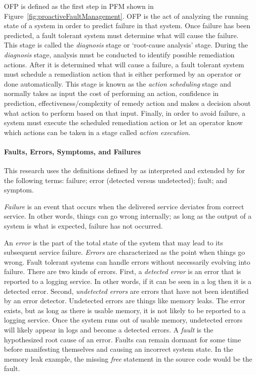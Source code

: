 
\ac{OFP} is defined as the first step in \ac{PFM} shown in
Figure~\ref{fig:proactiveFaultManagement}.  \ac{OFP} is the act of analyzing
the running state of a system in order to predict failure in that system. Once
failure has been predicted, a fault tolerant system must determine what will
cause the failure.  This stage is called the \emph{diagnosis} stage or
`root-cause analysis' stage.  During the \emph{diagnosis} stage, analysis
must be conducted to identify possible remediation actions.  After it is
determined what will cause a failure, a fault tolerant system must schedule a
remediation action that is either performed by an operator or done
automatically.  This stage is known as the \emph{action scheduling} stage and
normally takes as input the cost of performing an action, confidence in
prediction, effectiveness/complexity of remedy action and makes a decision
about what action to perform based on that input.  Finally, in order to avoid
failure, a system must execute the scheduled remediation action or let an
operator know which actions can be taken in a stage called \emph{action
execution}.

\paragraph{Faults, Errors, Symptoms, and Failures}
This research uses the definitions defined by \citet{avivzienis2004basic} as
interpreted and extended by \citet{salfnerSurvey} for the following terms:
failure; error (detected versus undetected); fault; and symptom.

\emph{Failure} is an event that occurs when the delivered service deviates from
correct service.  In other words, things can go wrong internally; as long as
the output of a system is what is expected, failure has not occurred.  

An \emph{error} is the part of the total state of the system that may lead to
its subsequent service failure.  \emph{Errors} are characterized as the point
when things go wrong.  Fault tolerant systems can handle errors without
necessarily evolving into failure.  There are two kinds of errors.  First, a
\emph{detected error} is an error that is reported to a logging service.  In
other words, if it can be seen in a log then it is a detected error.  Second,
\emph{undetected errors} are errors that have not been identified by an error
detector.  Undetected errors are things like memory leaks.  The error exists,
but as long as there is usable memory, it is not likely to be reported to a
logging service.  Once the system runs out of usable memory, undetected errors
will likely appear in logs and become a detected errors.  A \emph{fault} is the
hypothesized root cause of an error.  Faults can remain dormant for some time
before manifesting themselves and causing an incorrect system state.  In the
memory leak example, the missing \emph{free} statement in the source code would
be the fault.  

